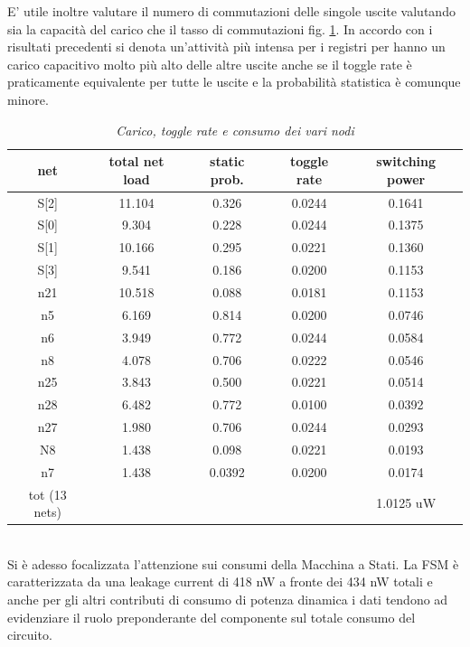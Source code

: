 E’ utile inoltre valutare il numero di commutazioni delle singole uscite valutando sia la capacità del carico che il tasso di commutazioni fig. \ref{attload}. In accordo con i risultati precedenti si denota un’attività più intensa per i registri per hanno un carico capacitivo molto più alto delle altre uscite anche se il toggle rate è praticamente equivalente per tutte le uscite e la probabilità statistica è comunque minore.\\ 
\begin{table}[!h]\footnotesize
	\centering
	\begin{tabular}{|c|c|c|c|c|}
		\hline
		\textbf{net} & \textbf{total net load} & \textbf{static prob.} & \textbf{toggle rate}& \textbf{switching power}\\
		\hline
		S[2] & 11.104 & 0.326 & 0.0244 & 0.1641\\
		\hline
		S[0] & 9.304 & 0.228 & 0.0244 & 0.1375\\
		\hline
		S[1] & 10.166 & 0.295 & 0.0221 & 0.1360\\
		\hline
		S[3] & 9.541 & 0.186 & 0.0200 & 0.1153\\
		\hline
		n21 & 10.518 & 0.088 & 0.0181 & 0.1153\\
		\hline
		n5 & 6.169 & 0.814 & 0.0200 & 0.0746\\
		\hline
		n6 & 3.949 & 0.772 & 0.0244 & 0.0584\\
		\hline
		n8 & 4.078 & 0.706 & 0.0222 & 0.0546\\
		\hline
		n25 & 3.843 & 0.500 & 0.0221 & 0.0514\\
		\hline
		n28 & 6.482 & 0.772 & 0.0100 & 0.0392\\
		\hline
		n27 & 1.980 & 0.706 & 0.0244 & 0.0293\\
		\hline
		N8 & 1.438 & 0.098 & 0.0221 & 0.0193\\
		\hline
		n7 & 1.438 & 0.0392 & 0.0200 & 0.0174\\
		\hline
		\hline
		tot (13 nets) &  &  &  & 1.0125 uW\\
		\hline 
	\end{tabular}
	\caption{\textit{Carico, toggle rate e consumo dei vari nodi}}
\label{attload}
\end{table} \\
Si è adesso focalizzata l’attenzione sui consumi della Macchina a Stati. La FSM è caratterizzata da una leakage current di 418 nW a fronte dei 434 nW totali e anche per gli altri contributi di consumo di potenza dinamica i dati tendono ad evidenziare il ruolo preponderante del componente sul totale consumo del circuito. 
